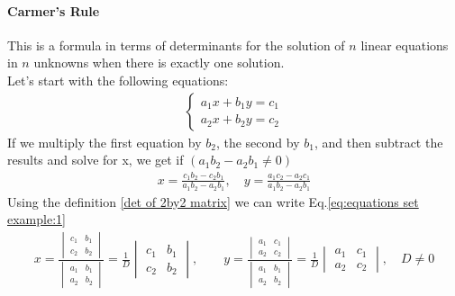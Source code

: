             \paragraph{Carmer's Rule} This is a formula in terms of determinants for the solution of $n$ linear equations 
            in $n$ unknowns when there is exactly one solution.\\
            Let's start with the following equations:
            \begin{align} \label{eq:equations set example}
                \begin{cases}
                    a_1x + b_1y = c_1 \\
                    a_2x + b_2y = c_2
                \end{cases}
            \end{align}
            If we multiply the first equation by $b_2$, the second by $b_1$, and then subtract the
            results and solve for x, we get if $(a_1b_2 - a_2b_1 \neq 0)$
            \begin{align} \label{eq:equations set example:1}
                x = \frac{c_1b_2 - c_2b_1}{a_1b_2 - a_2b_1}, \quad 
                y = \frac{a_1c_2 - a_2c_1}{a_1b_2 - a_2b_1}
            \end{align}
            Using the definition \eqref{det of 2by2 matrix} we can write Eq.\eqref{eq:equations set example:1}
            \begin{align}
                x = 
                \frac{\begin{vmatrix}
                    c_1 & b_1 \\
                    c_2 & b_2
                \end{vmatrix}}
                {\begin{vmatrix}
                    a_1 & b_1 \\
                    a_2 & b_2
                \end{vmatrix}} = \frac{1}{D}
                \begin{vmatrix}
                    c_1 & b_1 \\
                    c_2 & b_2
                \end{vmatrix}, \quad\quad
                y = 
                \frac{\begin{vmatrix}
                    a_1 & c_1 \\
                    a_2 & c_2
                \end{vmatrix}}
                {\begin{vmatrix}
                    a_1 & b_1 \\
                    a_2 & b_2
                \end{vmatrix}} = \frac{1}{D}
                \begin{vmatrix}
                    a_1 & c_1 \\
                    a_2 & c_2
                \end{vmatrix}, \quad D \neq 0
            \end{align}
